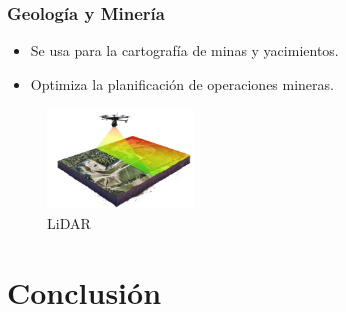 \documentclass{article}
\begin{document}
	\subsubsection{Geología y Minería}
	\begin{itemize}
		\item Se usa para la cartografía de minas y yacimientos.
		\item Optimiza la planificación de operaciones mineras.
	\end{itemize}
		\begin{figure}[H]
		\centering
		\includegraphics[width=0.35\textwidth]{lidar.png}
		\caption{LiDAR}
	\end{figure}
	

	\section{Conclusión}
	
\end{document}
